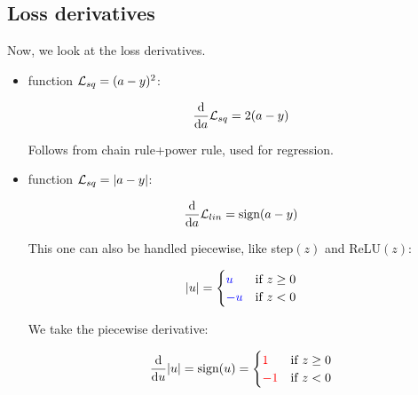     \secdiv
    
    \subsection{Loss derivatives}
    
        Now, we look at the loss derivatives.
        
        \begin{itemize}
            \item {} function $\mathcal{L}_{sq} = (a-y)^2$:
            
                \begin{equation}
                    \frac{\dd }{\dd a} \mathcal{L}_{sq} = 2(a-y)
                \end{equation}
                
                Follows from chain rule+power rule, used for regression.
                
            \item {} function $\mathcal{L}_{sq} = |a-y|$:
            
                \begin{equation}
                    \frac{\dd }{\dd a} \mathcal{L}_{lin} = \text{sign}(a-y)
                \end{equation}
                
                This one can also be handled piecewise, like step$(z)$ and ReLU$(z)$:
                
                \begin{equation}
                    |u| 
                    =
                    \begin{cases}
                      \textcolor{blue}{u} & \text{if $z \geq 0$}\\
                      \textcolor{blue}{-u} & \text{if $z < 0$}
                    \end{cases}
                \end{equation}
                
                We take the piecewise derivative:
                
                \begin{equation}
                    \frac{\dd }{\dd u}
                    |u|
                    =
                    \text{sign}(u) 
                    =
                    \begin{cases}
                      \textcolor{red}{1} & \text{if $z \geq 0$}\\
                      \textcolor{red}{-1} & \text{if $z < 0$}
                    \end{cases}
                \end{equation}
                

\end{itemize}
